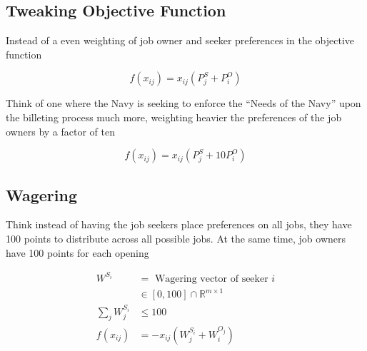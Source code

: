 \subsection{Tweaking Objective Function}

Instead of a even weighting of job owner and seeker preferences in the objective function

\[f(x_{ij}) = x_{ij}(P^S_j + P^O_i)\]

Think of one where the Navy is seeking to enforce the ``Needs of the Navy'' upon the billeting process much more, weighting heavier the preferences of the job owners by a factor of ten

\[f(x_{ij}) = x_{ij}(P^S_j + 10P^O_i)\]

\subsection{Wagering}

Think instead of having the job seekers place preferences on all jobs, they have 100 points to distribute across all possible jobs. At the same time, job owners have 100 points for each opening

\begin{align*}
W^{S_i} &= \text{ Wagering vector of seeker $i$} \\
& \in [0,100] \cap \mathbb{R}^{m \times 1} \\
\sum_j W^{S_i}_{j} &\leq 100 \\
f(x_{ij})&= -x_{ij}(W^{S_i}_j + W^{O_j}_i)
\end{align*}
